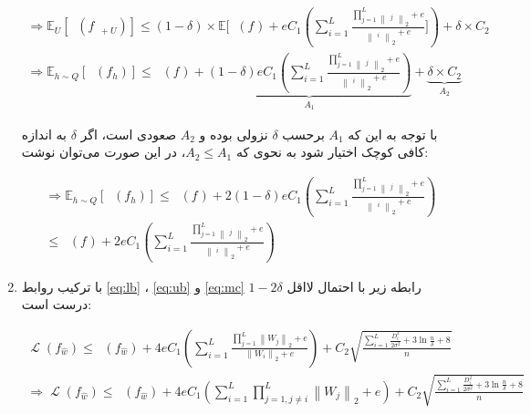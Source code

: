 \documentclass{article}
\DeclareMathOperator{\Wh}{\hat{W}}
\DeclareMathOperator{\Lossh}{\hat{\mathcal{L}}}
\DeclareMathOperator{\Loss}{\mathcal{L}}
\begin{document}
\begin{enumerate}
   \begin{align*}
    \Rightarrow 
    \mathbb{E}_U[\Lossh(f_{\Wh + U})] \leq
    (1-\delta) \times \mathbb{E}[
    \Lossh(f_{\Wh}) + e C_1
    (\sum_{i=1}^L
    \frac
    {\prod_{j=1}^{L}\left\lVert {\Wh}_j \right\rVert_2+e}
    {\left\lVert {\Wh}_i \right\rVert_2+e}]
    ) + \delta \times C_2 \\
    \Rightarrow 
    \mathbb{E}_{h\sim Q}[\Lossh(f_h)] \leq
    \Lossh(f_{\Wh}) + 
    \underbrace{
    (1-\delta) e C_1
    (\sum_{i=1}^L
    \frac
    {\prod_{j=1}^{L}\left\lVert {\Wh}_j \right\rVert_2+e}
    {\left\lVert {\Wh}_i \right\rVert_2+e}
    )}_{A_1} + \underbrace{\delta \times C_2}_{A_2}
\end{align*} 

با توجه به این که 
$A_1$
برحسب 
$\delta$
نزولی بوده و 
$A_2$
صعودی است،
اگر 
$\delta$
به اندازه کافی کوچک اختیار شود به نحوی که 
$A_2 \leq A_1$،
در این صورت
می‌توان نوشت:

   \begin{align*}
    \Rightarrow 
    \mathbb{E}_{h\sim Q}[\Lossh(f_h)] \leq
    \Lossh(f_{\Wh}) + 
    2(1-\delta) e C_1 
    (\sum_{i=1}^L
    \frac
    {\prod_{j=1}^{L}\left\lVert {\Wh}_j \right\rVert_2+e}
    {\left\lVert {\Wh}_i \right\rVert_2+e}
    ) \\
    \leq
    \Lossh(f_{\Wh}) + 
    2e C_1 
    (\sum_{i=1}^L
    \frac
    {\prod_{j=1}^{L}\left\lVert {\Wh}_j \right\rVert_2+e}
    {\left\lVert {\Wh}_i \right\rVert_2+e}
    )
\end{align*} 

\item
با ترکیب روابط 
\ref{eq:lb}
،
\ref{eq:ub}
و
\ref{eq:mc}
رابطه زیر با احتمال لااقل 
$1-2\delta$
درست است:


\begin{subequations}
\begin{alignat}{2}
    \Loss(f_{\hat{w}}) \leq \Lossh(f_{\hat{w}}) + 
    4e C_1 (\sum_{i=1}^L
    \frac
    {\prod_{j=1}^{L}\left\lVert W_j \right\rVert_2+e}
    {\left\lVert W_i \right\rVert_2+e}
    ) +  C_2 \sqrt{\frac
    {\sum_{i=1}^L \frac{D_i^2}{2\sigma^2} + 3 \ln {\frac{n}{\delta}} + 8}
    {n}}\\
    \Rightarrow
    \Loss(f_{\hat{w}}) \leq \Lossh(f_{\hat{w}}) + 
    4e C_1 (\sum_{i=1}^L
    \prod_{j=1, j\neq i}^{L}\left\lVert W_j \right\rVert_2+e
    ) +  C_2 \sqrt{\frac
    {\sum_{i=1}^L \frac{D_i^2}{2\sigma^2} + 3 \ln {\frac{n}{\delta}} + 8}
    {n}}
\end{alignat}
\end{subequations}


\end{enumerate}
\end{document}
